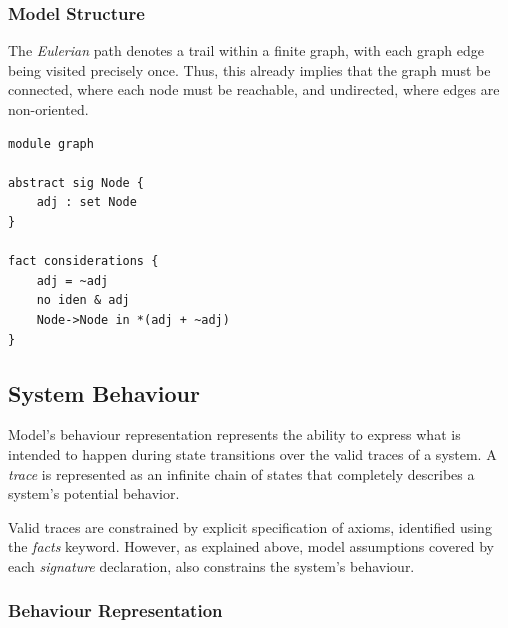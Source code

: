 \subsubsection{Model Structure}

The \textit{Eulerian} path denotes a trail within a finite graph, with each graph edge being visited precisely once. Thus, this already implies that the graph must be connected, where each node must be reachable, and undirected, where edges are non-oriented. 

\begin{lstlisting}[title={Graph definition.}, otherkeywords = {abstract, sig, module, set, fact, iden, no, in}]
module graph

abstract sig Node {
    adj : set Node
}

fact considerations {
    adj = ~adj
    no iden & adj
    Node->Node in *(adj + ~adj)
}
\end{lstlisting}



\subsection{System Behaviour}

Model's behaviour representation represents the ability to express what is intended to happen during state transitions over the valid traces of a system. A \textit{trace} is represented as an infinite chain of states that completely describes a system's potential behavior.

Valid traces are constrained by explicit specification of axioms, identified using the \textit{facts} keyword. However, as explained above, model assumptions covered by each \textit{signature} declaration, also constrains the system's behaviour. 


\subsubsection{Behaviour Representation}



